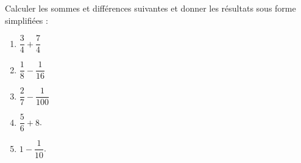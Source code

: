
\begin{exercice}\label{exosmath-0838}

Calculer les sommes et différences suivantes et donner les résultats sous forme simplifiées :
\begin{multicols}{2}
    \begin{enumerate}
        \item
            \( \dfrac{ 3 }{ 4 }+\dfrac{ 7 }{ 4 }\)
        \item
            \( \dfrac{ 1 }{ 8 }-\dfrac{ 1 }{ 16 }\)
        \item
            \( \dfrac{ 2 }{ 7 }-\dfrac{ 1 }{ 100 }\)
        \item
            \( \dfrac{ 5 }{ 6 }+8\).
        \item
            \( 1-\dfrac{1}{ 10 }\).
    \end{enumerate}
\end{multicols}

\end{exercice}
